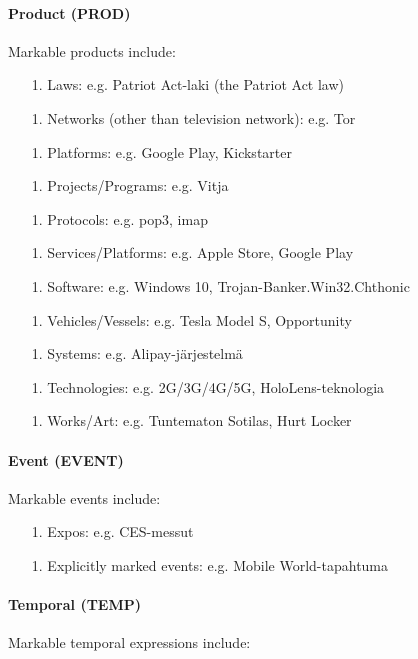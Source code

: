 \documentclass[11pt]{article}
\begin{document}
\paragraph{Product (PROD)}

Markable products include:

\begin{itemize}

\item[1.] Laws: e.g. Patriot Act-laki (the Patriot Act law)
\item[1.] Networks (other than television network): e.g. Tor
\item[1.] Platforms: e.g. Google Play, Kickstarter
\item[1.] Projects/Programs: e.g. Vitja
\item[1.] Protocols: e.g. pop3, imap
\item[1.] Services/Platforms: e.g. Apple Store, Google Play
\item[1.] Software: e.g. Windows 10, Trojan-Banker.Win32.Chthonic
\item[1.] Vehicles/Vessels: e.g. Tesla Model S, Opportunity
\item[1.] Systems: e.g. Alipay-j\"arjestelm\"a
\item[1.] Technologies: e.g. 2G/3G/4G/5G, HoloLens-teknologia
\item[1.] Works/Art: e.g. Tuntematon Sotilas, Hurt Locker
 
\end{itemize}


\paragraph{Event (EVENT)}

Markable events include:

\begin{itemize}

\item[1.] Expos: e.g. CES-messut
\item[1.] Explicitly marked events: e.g. Mobile World-tapahtuma

\end{itemize}


\paragraph{Temporal (TEMP)} Markable temporal expressions include:
\end{document}
